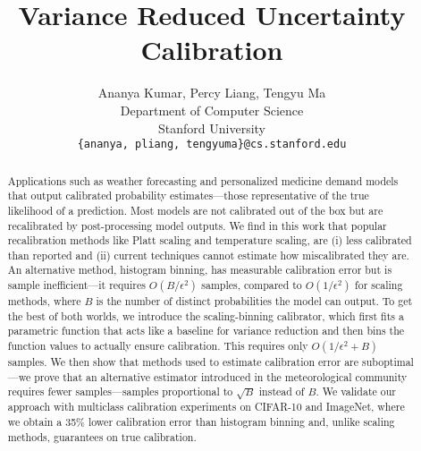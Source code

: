 \documentclass{article}
\title{Variance Reduced Uncertainty Calibration}
\author{%
  Ananya Kumar, Percy Liang, Tengyu Ma \\
  Department of Computer Science\\
  Stanford University\\
  \texttt{\{ananya, pliang, tengyuma\}@cs.stanford.edu} \\
}
\newcommand{\ourcal}[0]{the scaling-binning calibrator}
\begin{document}
\maketitle

\begin{abstract}
Applications such as weather forecasting and personalized medicine demand models that output calibrated probability estimates---those representative of the true likelihood of a prediction. Most models are not calibrated out of the box but are recalibrated by post-processing model outputs. We find in this work that popular recalibration methods like Platt scaling and temperature scaling, are (i) less calibrated than reported and (ii) current techniques cannot estimate how miscalibrated they are. An alternative method, histogram binning, has measurable calibration error but is sample inefficient---it requires $O(B/\epsilon^2)$ samples, compared to $O(1/\epsilon^2)$ for scaling methods, where $B$ is the number of distinct probabilities the model can output. To get the best of both worlds, we introduce \ourcal{}, which first fits a parametric function that acts like a baseline for variance reduction and then bins the function values to actually ensure calibration. This requires only $O(1/\epsilon^2 + B)$ samples. We then show that methods used to estimate calibration error are suboptimal---we prove that an alternative estimator introduced in the meteorological community requires fewer samples---samples proportional to $\sqrt{B}$ instead of $B$. We validate our approach with multiclass calibration experiments on CIFAR-10 and ImageNet, where we obtain a 35\% lower calibration error than histogram binning and, unlike scaling methods, guarantees on true calibration.


\end{abstract}
\end{document}
